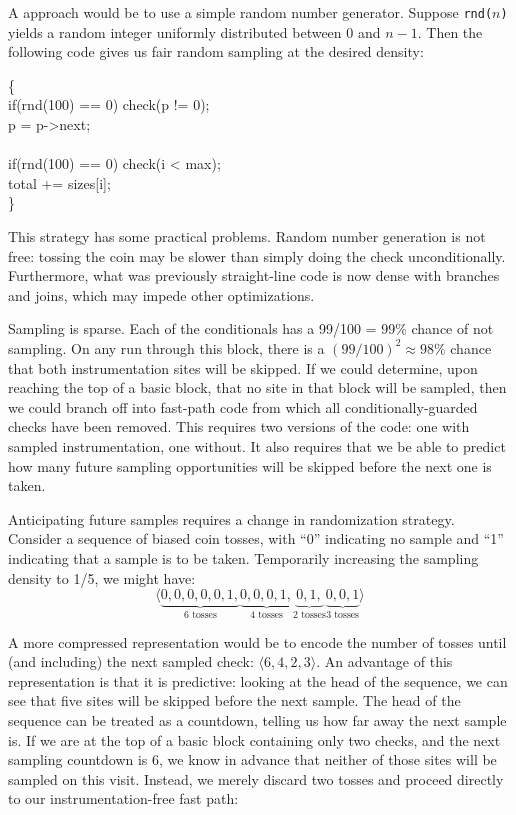 A \naive approach would be to use a simple random number generator.
Suppose \texttt{rnd($n$)} yields a random integer uniformly
distributed between 0 and $n-1$.  Then the following code gives us
fair random sampling at the desired density:

\begin{code}
  \{\+ \\
  if(rnd(100) == 0) check(p != 0); \\
  \up p = p->next; \\
  \\
  if(rnd(100) == 0) check(i < max); \\
  \up total += sizes[i]; \\
  \<\}
\end{code}

This strategy has some practical problems.  Random number generation
is not free: tossing the coin may be slower than simply doing the
check unconditionally.  Furthermore, what was previously straight-line
code is now dense with branches and joins, which may impede other
optimizations.

Sampling is sparse.  Each of the conditionals has a 99/100 = 99\%
chance of not sampling.  On any run through this block, there is a
$(99/100)^2 \approx 98\%$ chance that both instrumentation sites will
be skipped.  If we could determine, upon reaching the top of a basic
block, that no site in that block will be sampled, then we could
branch off into fast-path code from which all conditionally-guarded
checks have been removed.  This requires two versions of the code: one
with sampled instrumentation, one without.  It also requires that we
be able to predict how many future sampling opportunities will be
skipped before the next one is taken.

Anticipating future samples requires a change in randomization
strategy.  Consider a sequence of biased coin tosses, with ``0''
indicating no sample and ``1'' indicating that a sample is to be
taken.  Temporarily increasing the sampling density to 1/5, we might
have:
\begin{equation*}
  \langle
    \underbrace{0, 0, 0, 0, 0, 1,}_{\text{6 tosses}}
    \underbrace{0, 0, 0, 1,}_{\text{4 tosses}}
    \underbrace{0, 1,}_{\text{2 tosses}}
    \underbrace{0, 0, 1}_{\text{3 tosses}}
    \rangle
\end{equation*}

A more compressed representation would be to encode the number of
tosses until (and including) the next sampled check: $\langle 6, 4, 2,
3 \rangle$.  An advantage of this representation is that it is
predictive: looking at the head of the sequence, we can see that five
sites will be skipped before the next sample.  The head of the
sequence can be treated as a countdown, telling us how far away the
next sample is.  If we are at the top of a basic block containing only
two checks, and the next sampling countdown is 6, we know in advance
that neither of those sites will be sampled on this visit.  Instead,
we merely discard two tosses and proceed directly to our
instrumentation-free fast path:

